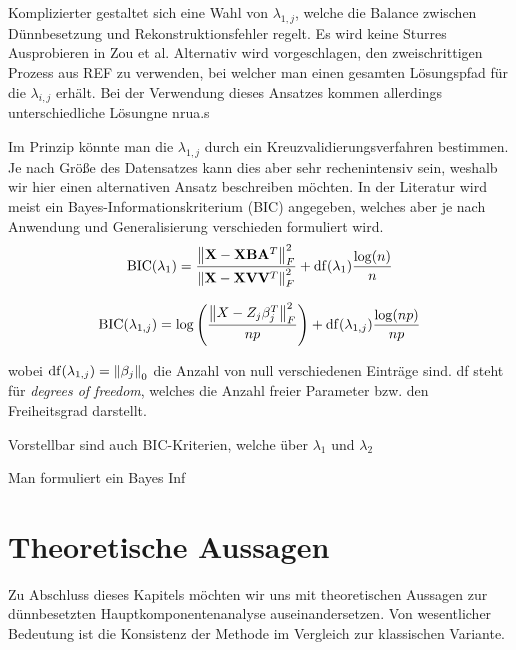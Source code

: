 Komplizierter gestaltet sich eine Wahl von $\lambda_{1,j}$, welche die Balance zwischen Dünnbesetzung und Rekonstruktionsfehler regelt. Es wird keine Sturres Ausprobieren in Zou et al. Alternativ wird vorgeschlagen, den zweischrittigen Prozess aus REF zu verwenden, bei welcher man einen gesamten Lösungspfad für die $\lambda_{i,j}$ erhält. Bei der Verwendung dieses Ansatzes kommen allerdings unterschiedliche Lösungne nrua.s

Im Prinzip könnte man die $\lambda_{1,j}$ durch ein Kreuzvalidierungsverfahren bestimmen. Je nach Größe des Datensatzes kann dies aber sehr rechenintensiv sein, weshalb wir hier einen alternativen Ansatz beschreiben möchten. In der Literatur wird meist ein Bayes-Informationskriterium (BIC) angegeben, welches aber je nach Anwendung und Generalisierung verschieden formuliert wird.
\begin{align}
\operatorname{BIC}(\lambda_1) = \frac{\left\lVert \mathbf{X} - \mathbf{X} \mathbf{B} \mathbf{A}^T \right\rVert_{F}^{2}}{\left\lVert \mathbf{X} - \mathbf{X} \mathbf{V} \mathbf{V}^T \right\rVert_{F}^{2}} + \operatorname{df}(\lambda_1) \frac{\log(n)}{n}
\end{align}
\cite{croux, guo}

\begin{align}
\operatorname{BIC}(\lambda_{1,j}) = \log\left(\frac{\left\lVert X - Z_j\beta_j^T \right\rVert_{F}^{2}}{np}\right) + \operatorname{df}(\lambda_{1,j}) \frac{\log(np)}{np}
\end{align}
\cite{hubert, allen}

wobei $\operatorname{df}(\lambda_{1,j}) = \left\lVert \beta_j \right\rVert_0$ die Anzahl von null verschiedenen Einträge sind. df steht für \textit{degrees of freedom}, welches die Anzahl freier Parameter bzw. den Freiheitsgrad darstellt.

Vorstellbar sind auch BIC-Kriterien, welche über $\lambda_1$ und $\lambda_2$

Man formuliert ein Bayes Inf





\section{Theoretische Aussagen} 
\label{spca_theorems}


Zu Abschluss dieses Kapitels möchten wir uns mit theoretischen Aussagen zur dünnbesetzten Hauptkomponentenanalyse auseinandersetzen.  Von wesentlicher Bedeutung ist die Konsistenz der Methode im Vergleich zur klassischen Variante.





